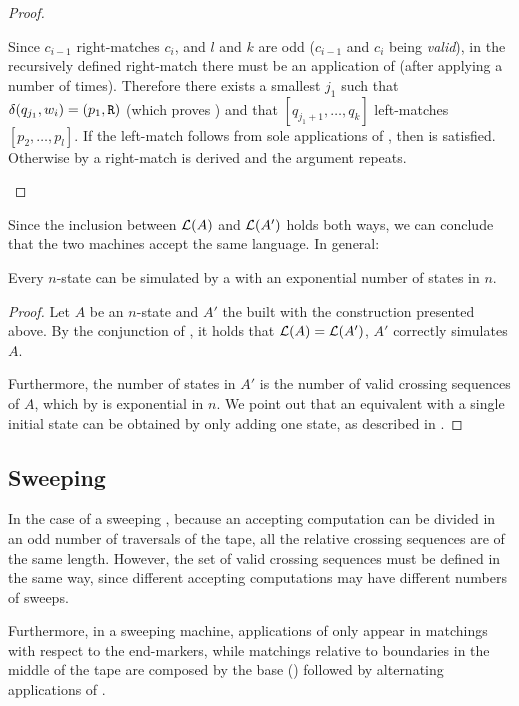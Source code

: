 \begin{proof}
\begin{description}
		      Since $c_{i-1}$ right-matches $c_i$, and $l$ and $k$ are odd ($c_{i-1}$ and $c_i$ being \emph{valid}), in the recursively defined right-match there must be an application of  (after applying  a number of times).
		      Therefore there exists a smallest $j_1$ such that $\delta(q_{j_1},w_i)=(p_1,\mathtt R)$ (which proves ) and that $[q_{j_1+1},\dots,q_k]$ left-matches $[p_2,\dots,p_l]$.
		      If the left-match follows from sole applications of , then  is satisfied.
		      Otherwise by  a right-match is derived and the argument repeats. \qedhere
	\end{description}
\end{proof}

Since the inclusion between $\mathcal L(A)$ and $\mathcal L(A')$ holds both ways, we can conclude that the two machines accept the same language.
In general:
\begin{thrm}\label{thm:2DFAto1NFA}
	Every $n$-state \TDFA can be simulated by a \ONFA with an exponential number of states in $n$.
\end{thrm}
\begin{proof}
	Let $A$ be an $n$-state \TDFA and $A'$ the \ONFA built with the construction presented above.
	By the conjunction of , it holds that $\mathcal L(A)=\mathcal L(A')$, \ie $A'$ correctly simulates $A$.

	Furthermore, the number of states in $A'$ is the number of valid crossing sequences of $A$, which by  is exponential in $n$.
	We point out that an equivalent \ONFA with a single initial state can be obtained by only adding one state, as described in .
\end{proof}


\subsection{Sweeping \texorpdfstring{\TDFAs}{2DFAs}}\label{sub:swep2DFA}
In the case of a sweeping \TDFA, because an accepting computation can be divided in an odd number of traversals of the tape, all the relative crossing sequences are of the same length.
However, the set of valid crossing sequences must be defined in the same way, since different accepting computations may have different numbers of sweeps.

Furthermore, in a sweeping machine, applications of  only appear in matchings with respect to the end-markers, while matchings relative to boundaries in the middle of the tape are composed by the base () followed by alternating applications of .



